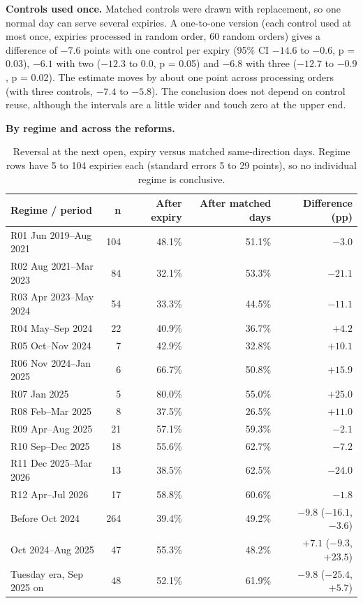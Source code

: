 \documentclass[10pt,a4paper]{article}
\begin{document}
\textbf{Controls used once.} Matched controls were drawn with replacement, so one normal day can serve several expiries. A one-to-one version (each control used at most once, expiries processed in random order, 60 random orders) gives a difference of $-7.6$ points with one control per expiry (95\% CI $-14.6$ to $-0.6$, p = 0.03), $-6.1$ with two ($-12.3$ to $0.0$, p = 0.05) and $-6.8$ with three ($-12.7$ to $-0.9$, p = 0.02). The estimate moves by about one point across processing orders (with three controls, $-7.4$ to $-5.8$). The conclusion does not depend on control reuse, although the intervals are a little wider and touch zero at the upper end.

\textbf{By regime and across the reforms.}
\begin{table}[h!]\centering\small
\begin{tabular}{lrrrr}
\toprule
Regime / period & n & After expiry & After matched days & Difference (pp)\\
\midrule
R01 Jun 2019--Aug 2021 & 104 & 48.1\% & 51.1\% & $-3.0$\\
R02 Aug 2021--Mar 2023 & 84 & 32.1\% & 53.3\% & $-21.1$\\
R03 Apr 2023--May 2024 & 54 & 33.3\% & 44.5\% & $-11.1$\\
R04 May--Sep 2024 & 22 & 40.9\% & 36.7\% & $+4.2$\\
R05 Oct--Nov 2024 & 7 & 42.9\% & 32.8\% & $+10.1$\\
R06 Nov 2024--Jan 2025 & 6 & 66.7\% & 50.8\% & $+15.9$\\
R07 Jan 2025 & 5 & 80.0\% & 55.0\% & $+25.0$\\
R08 Feb--Mar 2025 & 8 & 37.5\% & 26.5\% & $+11.0$\\
R09 Apr--Aug 2025 & 21 & 57.1\% & 59.3\% & $-2.1$\\
R10 Sep--Dec 2025 & 18 & 55.6\% & 62.7\% & $-7.2$\\
R11 Dec 2025--Mar 2026 & 13 & 38.5\% & 62.5\% & $-24.0$\\
R12 Apr--Jul 2026 & 17 & 58.8\% & 60.6\% & $-1.8$\\
\midrule
Before Oct 2024 & 264 & 39.4\% & 49.2\% & $-9.8$ ($-16.1$, $-3.6$)\\
Oct 2024--Aug 2025 & 47 & 55.3\% & 48.2\% & $+7.1$ ($-9.3$, $+23.5$)\\
Tuesday era, Sep 2025 on & 48 & 52.1\% & 61.9\% & $-9.8$ ($-25.4$, $+5.7$)\\
\bottomrule
\end{tabular}
\caption{Reversal at the next open, expiry versus matched same-direction days. Regime rows have 5 to 104 expiries each (standard errors 5 to 29 points), so no individual regime is conclusive.}
\end{table}
\end{document}
